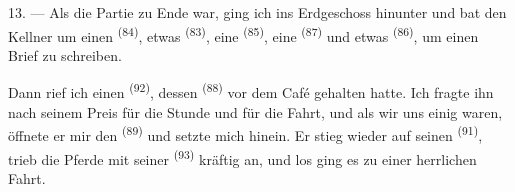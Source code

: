 13. --- Als die Partie zu Ende war, ging ich ins Erdgeschoss hinunter und bat den
Kellner um einen  \textsuperscript{(84)}, etwas 
\textsuperscript{(83)}, eine  \textsuperscript{(85)}, eine
 \textsuperscript{(87)} und etwas  \textsuperscript{(86)},
um einen Brief zu schreiben.

Dann rief ich einen  \textsuperscript{(92)}, dessen 
\textsuperscript{(88)} vor dem Café gehalten hatte. Ich fragte ihn nach seinem Preis
für die Stunde und für die Fahrt, und als wir uns einig waren, öffnete er mir den
 \textsuperscript{(89)} und setzte mich hinein. Er stieg wieder
auf seinen  \textsuperscript{(91)}, trieb die Pferde mit seiner
 \textsuperscript{(93)} kräftig an, und los ging es zu einer
herrlichen Fahrt.
\VUsaut{6.0mm}
\VUfilet{22mm}
